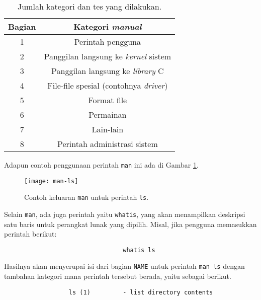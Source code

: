 \begin{table}[H]
	\caption{Jumlah kategori dan tes yang dilakukan.}
    \label{tab:commandline-linux-manpage-sections}
    \centering
    \begin{tabular}{| c | c |}
    \hline
        \textbf{Bagian} & \textbf{Kategori \textit{manual}} \\
    \hline
    \hline
        1 & Perintah pengguna \\
    \hline
        2 & Panggilan langsung ke \textit{kernel} sistem \\
    \hline
        3 & Panggilan langsung ke \textit{library} C \\
    \hline
        4 & File-file spesial (contohnya \textit{driver}) \\
    \hline
        5 & Format file \\
    \hline
        6 & Permainan \\
    \hline
		7 & Lain-lain \\
	\hline
		8 & Perintah administrasi sistem \\
	\hline
	\end{tabular}
\end{table}
\noindent
Adapun contoh penggunaan perintah \texttt{man} ini ada di Gambar \ref{fig:commandline-linux-man}.
\newpage\vspace*{-3em}  %
\begin{figure}[ht]
    \centering
    \texttt{[image: man-ls]}
    \caption[Contoh keluaran \textit{man page}]{Contoh keluaran \texttt{man} untuk perintah \texttt{ls}.}
    \label{fig:commandline-linux-man}
\end{figure}

Selain \verb|man|, ada juga perintah yaitu \verb|whatis|, yang akan menampilkan deskripsi satu baris untuk perangkat lunak yang dipilih. Misal, jika pengguna memasukkan perintah berikut:
\begin{verbatim}
                                 whatis ls
\end{verbatim}
\noindent
Hasilnya akan menyerupai isi dari bagian \verb|NAME| untuk perintah \verb|man ls| dengan tambahan kategori mana perintah tersebut berada, yaitu sebagai berikut.
\begin{verbatim}
                  ls (1)         - list directory contents
\end{verbatim}

